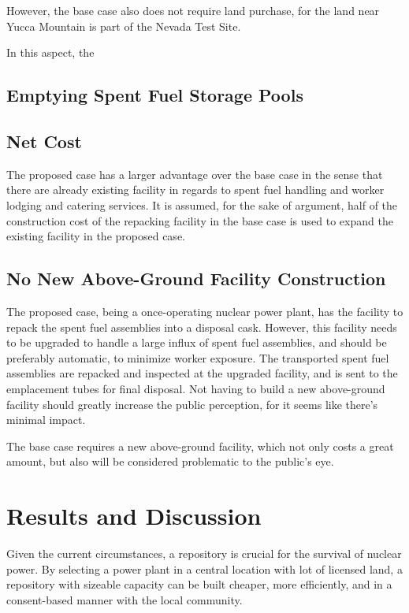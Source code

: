   However, the base case also does not require land purchase, for the land near 
  Yucca Mountain is part of the Nevada Test Site. 
  
  In this aspect, the 

\subsection{Emptying Spent Fuel Storage Pools }




\subsection{Net Cost}
The proposed case has a larger advantage over the base case in the sense that there
are already existing facility in regards to spent fuel handling and worker lodging 
and catering services. 
It is assumed, for the sake of argument, half of the construction cost of the
repacking facility in the base case is used to expand the existing facility in the
proposed case. 

\subsection{No New Above-Ground Facility Construction}
The proposed case, being a once-operating nuclear power plant, has the facility to 
repack the spent fuel assemblies into a disposal cask. However, this facility needs 
to be upgraded to handle a large influx of spent fuel assemblies, and should be
preferably automatic, to minimize worker exposure. The transported spent fuel
assemblies are repacked and inspected at the upgraded facility, and is sent to the
emplacement tubes for final disposal. Not having to build a new above-ground facility
should greatly increase the public perception, for it seems like there's minimal
impact.

The base case requires a new above-ground facility, which not only costs a great
amount, but also will be considered problematic to the public's eye. 


\section{Results and Discussion}
Given the current circumstances, a repository is crucial for the survival of nuclear
power. By selecting a power plant in a central location with lot of licensed land,
a repository with sizeable capacity can be built cheaper, more efficiently, and 
in a consent-based manner with the local community. 
